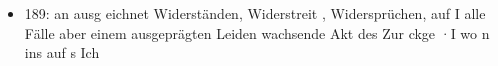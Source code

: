 \documentclass[emulatestandardclasses]{scrartcl}
\begin{document}
\begin{itemize}
  \item 189: an ausg eichnet  Widerständen, Widerstreit , Widersprüchen, auf
I alle Fälle aber   einem ausgeprägten Leiden  wachsende Akt des Zur ckge­ ·I wo n ins auf  s Ich
\end{itemize}


\newpage
%


\end{document}
